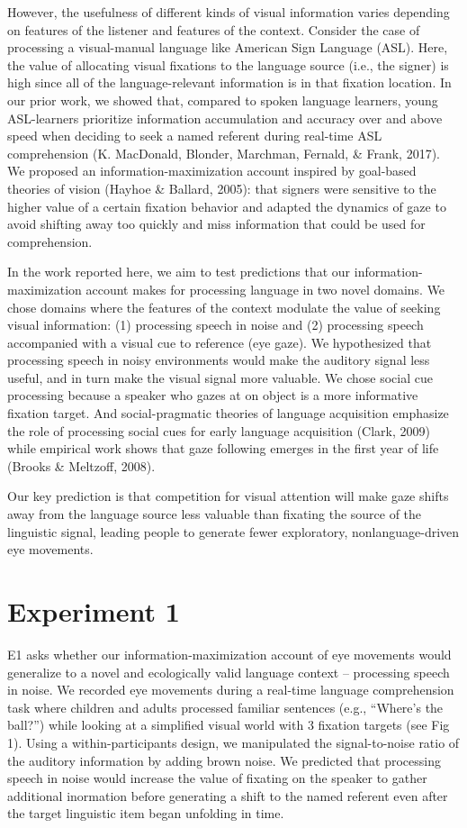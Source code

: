 \documentclass[10pt, letterpaper]{article}
\begin{document}
However, the usefulness of different kinds of visual information varies
depending on features of the listener and features of the context.
Consider the case of processing a visual-manual language like American
Sign Language (ASL). Here, the value of allocating visual fixations to
the language source (i.e., the signer) is high since all of the
language-relevant information is in that fixation location. In our prior
work, we showed that, compared to spoken language learners, young
ASL-learners prioritize information accumulation and accuracy over and
above speed when deciding to seek a named referent during real-time ASL
comprehension (K. MacDonald, Blonder, Marchman, Fernald, \& Frank,
2017). We proposed an information-maximization account inspired by
goal-based theories of vision (Hayhoe \& Ballard, 2005): that signers
were sensitive to the higher value of a certain fixation behavior and
adapted the dynamics of gaze to avoid shifting away too quickly and miss
information that could be used for comprehension.

In the work reported here, we aim to test predictions that our
information-maximization account makes for processing language in two
novel domains. We chose domains where the features of the context
modulate the value of seeking visual information: (1) processing speech
in noise and (2) processing speech accompanied with a visual cue to
reference (eye gaze). We hypothesized that processing speech in noisy
environments would make the auditory signal less useful, and in turn
make the visual signal more valuable. We chose social cue processing
because a speaker who gazes at on object is a more informative fixation
target. And social-pragmatic theories of language acquisition emphasize
the role of processing social cues for early language acquisition
(Clark, 2009) while empirical work shows that gaze following emerges in
the first year of life (Brooks \& Meltzoff, 2008).

Our key prediction is that competition for visual attention will make
gaze shifts away from the language source less valuable than fixating
the source of the linguistic signal, leading people to generate fewer
exploratory, nonlanguage-driven eye movements.

\section{Experiment 1}\label{experiment-1}

E1 asks whether our information-maximization account of eye movements
would generalize to a novel and ecologically valid language context --
processing speech in noise. We recorded eye movements during a real-time
language comprehension task where children and adults processed familiar
sentences (e.g., ``Where's the ball?'') while looking at a simplified
visual world with 3 fixation targets (see Fig 1). Using a
within-participants design, we manipulated the signal-to-noise ratio of
the auditory information by adding brown noise. We predicted that
processing speech in noise would increase the value of fixating on the
speaker to gather additional inormation before generating a shift to the
named referent even after the target linguistic item began unfolding in
time.
\end{document}

